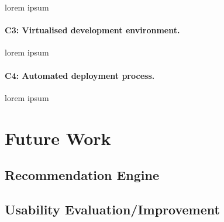 lorem ipsum

\paragraph{C3: Virtualised development environment.}

lorem ipsum

\paragraph{C4: Automated deployment process.}
 
lorem ipsum

\section{Future Work}

\subsection{Recommendation Engine}

\subsection{Usability Evaluation/Improvement}